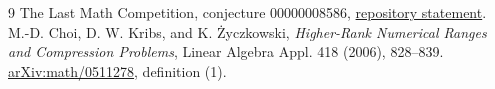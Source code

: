 \documentclass[11pt]{article}
\begin{document}
\small
\begin{thebibliography}{9}
 The Last Math Competition, conjecture 00000008586,
\href{https://github.com/The-Last-Math-Competition/The-Last-Math-Competition/blob/main/conjectures/00000008586.md}{repository statement}.
 M.-D. Choi, D. W. Kribs, and K. \.Zyczkowski,
\emph{Higher-Rank Numerical Ranges and Compression Problems},
Linear Algebra Appl. 418 (2006), 828--839.
\href{https://arxiv.org/abs/math/0511278}{arXiv:math/0511278}, definition (1).
\end{thebibliography}
\end{document}
